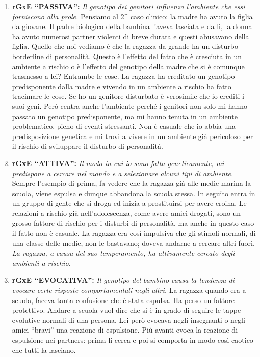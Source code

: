 \documentclass[]{article}
\begin{document}
\begin{enumerate}
\def\labelenumi{\arabic{enumi}.}
\item
  \textbf{rGxE ``PASSIVA'':} \emph{Il genotipo dei genitori influenza
  l'ambiente che essi forniscono alla prole.} Pensiamo al 2\^{} caso
  clinico: la madre ha avuto la figlia da giovane. Il padre biologico
  della bambina l'aveva lasciata e da li, la donna ha avuto numerosi
  partner violenti di breve durata e questi abusavano della figlia.
  Quello che noi vediamo è che la ragazza da grande ha un disturbo
  borderline di personalità. Questo è l'effetto del fatto che è
  cresciuta in un ambiente a rischio o è l'effetto del genotipo della
  madre che si è comunque trasmesso a lei? Entrambe le cose. La ragazza
  ha ereditato un genotipo predisponente dalla madre e vivendo in un
  ambiente a rischio ha fatto tracimare le cose. Se ho un genitore
  disturbato è verosimile che io erediti i suoi geni. Però centra anche
  l'ambiente perché i genitori non solo mi hanno passato un genotipo
  predisponente, ma mi hanno tenuta in un ambiente problematico, pieno
  di eventi stressanti. Non è casuale che io abbia una predisposizione
  genetica e mi trovi a vivere in un ambiente già pericoloso per il
  rischio di sviluppare il disturbo di personalità.
\item
  \textbf{rGxE ``ATTIVA'':} \emph{Il modo in cui io sono fatta
  geneticamente, mi predispone a cercare nel mondo e a selezionare
  alcuni tipi di ambiente.} Sempre l'esempio di prima, fa vedere che la
  ragazza già alle medie marina la scuola, viene espulsa e dunque
  abbandona la scuola stessa. In seguito entra in un gruppo di gente che
  si droga ed inizia a prostituirsi per avere eroina. Le relazioni a
  rischio già nell'adolescenza, come avere amici drogati, sono un grosso
  fattore di rischio per i disturbi di personalità, ma anche in questo
  caso il fatto non è casuale. La ragazza era così impulsiva che gli
  stimoli normali, di una classe delle medie, non le bastavano; doveva
  andarne a cercare altri fuori. \emph{La ragazza, a causa del suo
  temperamento, ha attivamente cercato degli ambienti a rischio.}
\item
  \textbf{rGxE ``EVOCATIVA'':} \emph{Il genotipo del bambino causa la
  tendenza di evocare certe risposte comportamentali negli altri.} La
  ragazza quando era a scuola, faceva tanta confusione che è stata
  espulsa. Ha perso un fattore protettivo. Andare a scuola vuol dire che
  si è in grado di seguire le tappe evolutive normali di una persona.
  Lei però evocava negli insegnanti o negli amici ``bravi'' una reazione
  di espulsione. Più avanti evoca la reazione di espulsione nei
  partners: prima li cerca e poi si comporta in modo così caotico che
  tutti la lasciano.
\end{enumerate}
\end{document}
